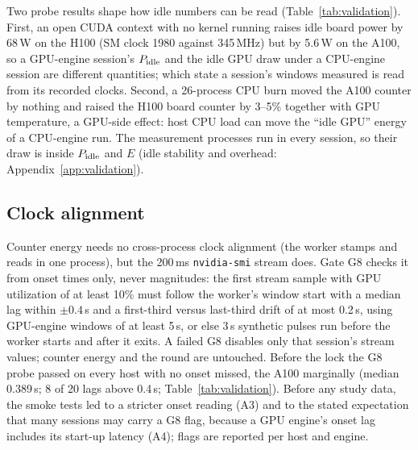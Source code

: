\documentclass[sigconf]{acmart}
\begin{document}
Two probe results shape how idle numbers can be read (Table~\ref{tab:validation}). First, an
open CUDA context with no kernel running raises idle board power by 68\,W on the H100 (SM clock
1980 against 345\,MHz) but by 5.6\,W on the A100, so a GPU-engine session's $P_{\mathrm{idle}}$ and the idle
GPU draw under a CPU-engine session are different quantities; which state a session's windows
measured is read from its recorded clocks. Second, a 26-process CPU burn moved the A100 counter
by nothing and raised the H100 board counter by 3--5\% together with GPU temperature, a GPU-side
effect: host CPU load can move the ``idle GPU'' energy of a CPU-engine run. The measurement processes run in every session, so their draw is inside $P_{\mathrm{idle}}$ and $E$
(idle stability and overhead: Appendix~\ref{app:validation}).

\subsection{Clock alignment}
\label{sec:clock}
Counter energy needs no cross-process clock alignment (the worker stamps and reads in one
process), but the 200\,ms \texttt{nvidia-smi} stream does. Gate G8 checks it from onset times
only, never magnitudes: the first stream sample with GPU utilization of at least 10\% must
follow the worker's window start with a median lag within $\pm 0.4$\,s and a first-third
versus last-third drift of at most 0.2\,s, using GPU-engine windows of at least 5\,s, or else 3\,s
synthetic pulses run before the worker starts and after it exits. A failed G8 disables only that
session's stream values; counter energy and the round are untouched. Before the lock the G8
probe passed on every host with no onset missed, the A100 marginally (median 0.389\,s; 8 of 20
lags above 0.4\,s; Table~\ref{tab:validation}). Before any study data, the smoke tests led to a stricter onset reading (A3) and to the stated
expectation that many sessions may carry a G8 flag, because a GPU engine's onset lag includes its
start-up latency (A4); flags are reported per host and engine.
\end{document}
